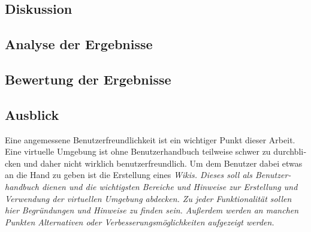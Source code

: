 \begin{otherlanguage}{ngerman}
\section{Diskussion}
\subsection{Analyse der Ergebnisse}
\subsection{Bewertung der Ergebnisse}
\subsection{Ausblick}
Eine angemessene Benutzerfreundlichkeit ist ein wichtiger Punkt dieser Arbeit. Eine virtuelle Umgebung ist ohne Benutzerhandbuch teilweise schwer zu durchblicken und daher nicht wirklich benutzerfreundlich. Um dem Benutzer dabei etwas an die Hand zu geben ist die Erstellung eines \it Wikis\rm. Dieses soll als Benutzerhandbuch dienen und die wichtigsten Bereiche und Hinweise zur Erstellung und Verwendung der virtuellen Umgebung abdecken. Zu jeder Funktionalität sollen hier Begründungen und Hinweise zu finden sein. Außerdem werden an manchen Punkten Alternativen oder Verbesserungsmöglichkeiten aufgezeigt werden. 
\end{otherlanguage}